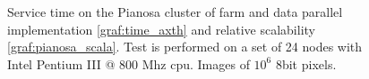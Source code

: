 \begin{figure}[p]
\centering
{}
\caption{ Service time on the Pianosa cluster of farm and data parallel implementation \ref{graf:time_axth} and relative scalability \ref{graf:pianosa_scala}.  Test is performed on a set of 24 nodes with Intel Pentium III @ 800 Mhz cpu. Images of $10^6$ 8bit pixels.}
\label{chart:pianosa_comm}
\end{figure}

